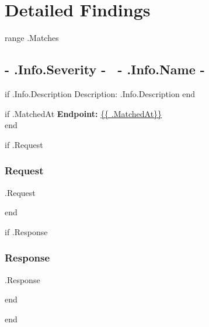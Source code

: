 \documentclass{article}
\begin{document}
\section{Detailed Findings}

\localtableofcontents

{{range .Matches}}

	\subsection{ \colorbox{ {{- .Info.Severity -}} }{ {{- .Info.Severity -}} }~{{- .Info.Name -}} }

	{{if .Info.Description}}
	Description: {{ .Info.Description }}
	{{end}}

	{{if .MatchedAt }}
	\smallskip
	\noindent
	\textbf{Endpoint: }\url{ {{ .MatchedAt}} }\\
	{{end}}

	{{if .Request}}

	\subsubsection{Request}

    \begin{Highlighting}
{{.Request}} 
    \end{Highlighting}
	{{end}}

	{{if .Response}}
    \subsubsection{Response}
    \begin{Highlighting}
{{.Response}}
    \end{Highlighting}
	{{end}}
 
{{end}}

\end{document}
